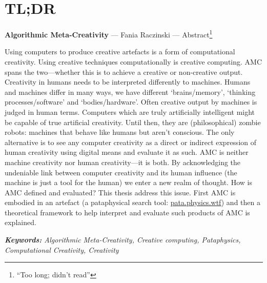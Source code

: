 
\pagestyle{empty}

\chapter{TL;DR}
\label{abstract}

{\Large \textbf{Algorithmic Meta-Creativity}} --- Fania Raczinski --- Abstract\footnote{``Too long; didn't read''}

\vspace{0.2cm}

Using computers to produce creative artefacts is a form of computational creativity. Using creative techniques computationally is creative computing. \ac{AMC} spans the two---whether this is to achieve a creative or non-creative output. Creativity in humans needs to be interpreted differently to machines. Humans and machines differ in many ways, we have different `brains/memory', `thinking processes/software' and `bodies/hardware'. Often creative output by machines is judged in human terms. Computers which are truly artificially intelligent might be capable of true artificial creativity. Until then, they are (philosophical) zombie robots: machines that behave like humans but aren't conscious. The only alternative is to see any computer creativity as a direct or indirect expression of human creativity using digital means and evaluate it as such. \ac{AMC} is neither machine creativity nor human creativity---it is both. By acknowledging the undeniable link between computer creativity and its human influence (the machine is just a tool for the human) we enter a new realm of thought. How is \ac{AMC} defined and evaluated? This thesis address this issue. First \ac{AMC} is embodied in an artefact (a pataphysical search tool: \url{pata.physics.wtf}) and then a theoretical framework to help interpret and evaluate such products of \ac{AMC} is explained.

\textit{\textbf{Keywords:} Algorithmic Meta-Creativity, Creative computing, Pataphysics, Computational Creativity, Creativity}

\clearpage
